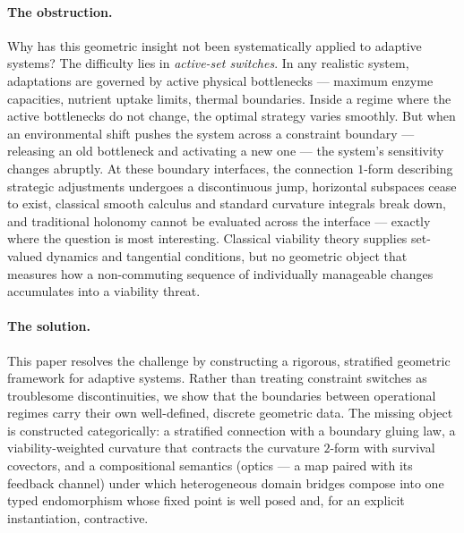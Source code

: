 \documentclass[11pt,a4paper]{article}
\theoremstyle{plain}
\theoremstyle{definition}
\theoremstyle{remark}
\begin{document}
\paragraph{The obstruction.}
Why has this geometric insight not been systematically applied to
adaptive systems? The difficulty lies in \emph{active-set
switches}. In any realistic system, adaptations are governed by
active physical bottlenecks --- maximum enzyme capacities, nutrient
uptake limits, thermal boundaries. Inside a regime where the active
bottlenecks do not change, the optimal strategy varies smoothly.
But when an environmental shift pushes the system across a
constraint boundary --- releasing an old bottleneck and activating
a new one --- the system's sensitivity changes abruptly. At these
boundary interfaces, the connection $1$-form describing
strategic adjustments undergoes a discontinuous jump, horizontal
subspaces cease to exist, classical smooth calculus and standard
curvature integrals break down, and traditional holonomy cannot be
evaluated across the interface --- exactly where the question is
most interesting. Classical viability theory supplies set-valued
dynamics and tangential conditions, but no geometric object that
measures how a non-commuting sequence of individually manageable
changes accumulates into a viability threat.

\paragraph{The solution.}
This paper resolves the challenge by constructing a rigorous,
stratified geometric framework for adaptive systems. Rather than
treating constraint switches as troublesome discontinuities, we
show that the boundaries between operational regimes carry their
own well-defined, discrete geometric data. The missing object is
constructed categorically: a stratified connection with a boundary
gluing law, a viability-weighted curvature that contracts the
curvature $2$-form with survival covectors, and a compositional
semantics (optics --- a map paired with its feedback channel) under
which heterogeneous domain bridges compose into one typed
endomorphism whose fixed point is well posed and, for an explicit
instantiation, contractive.
\end{document}
